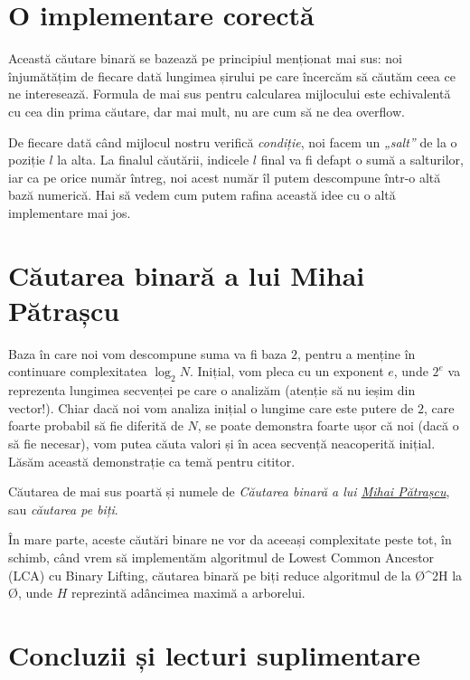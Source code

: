 \section{O implementare corectă}

Această căutare binară se bazează pe principiul menționat mai sus: noi înjumătățim de fiecare dată lungimea șirului pe care încercăm să căutăm ceea ce ne interesează. Formula de mai sus pentru calcularea mijlocului este echivalentă cu cea din prima căutare, dar mai mult, nu are cum să ne dea overflow.

De fiecare dată când mijlocul nostru verifică \emph{condiție}, noi facem un \emph{„salt”} de la o poziție $l$ la alta. La finalul căutării, indicele $l$ final va fi defapt o sumă a salturilor, iar ca pe orice număr întreg, noi acest număr îl putem descompune într-o altă bază numerică. Hai să vedem cum putem rafina această idee cu o altă implementare mai jos.

\section{Căutarea binară a lui Mihai Pătrașcu}

Baza în care noi vom descompune suma va fi baza $2$, pentru a menține în continuare complexitatea $\log_2 N$. Inițial, vom pleca cu un exponent $e$, unde $2^e$ va reprezenta lungimea secvenței pe care o analizăm (atenție să nu ieșim din vector!). Chiar dacă noi vom analiza inițial o lungime care este putere de $2$, care foarte probabil să fie diferită de $N$, se poate demonstra foarte ușor că noi (dacă o să fie necesar), vom putea căuta valori și în acea secvență neacoperită inițial. Lăsăm această demonstrație ca temă pentru cititor.

Căutarea de mai sus poartă și numele de \emph{Căutarea binară a lui \href{http://people.csail.mit.edu/mip/}{Mihai Pătrașcu}}, sau \emph{căutarea pe biți}.

În mare parte, aceste căutări binare ne vor da aceeași complexitate peste tot, în schimb, când vrem să implementăm algoritmul de Lowest Common Ancestor (LCA) cu Binary Lifting, căutarea binară pe biți reduce algoritmul de la \O{\log^2{H}} la \O{}, unde $H$ reprezintă adâncimea maximă a arborelui.

\section{Concluzii și lecturi suplimentare}

